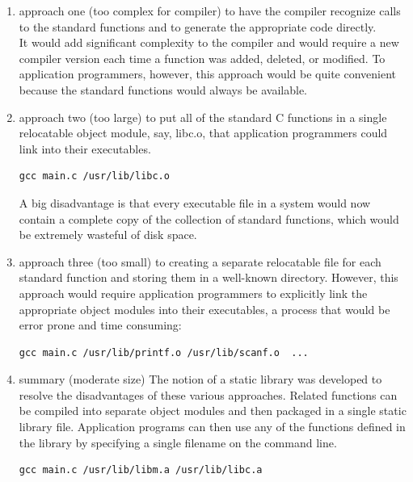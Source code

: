 \documentclass[11pt]{article}
\begin{document}
\begin{enumerate}
\item approach one (too complex for compiler)
\label{sec:org861f91d}
to have the compiler recognize calls to the standard functions and to generate the appropriate code directly.\\
It would add significant complexity to the compiler and would require a new compiler version each time a function was added, deleted, or modified. To application programmers, however, this approach would be quite convenient because the standard functions would always be available.\\

\item approach two (too large)
\label{sec:orgc216fb0}
to put all of the standard C functions in a single relocatable object module, say, libc.o, that application programmers could link into their executables.\\
\begin{verbatim}
gcc main.c /usr/lib/libc.o
\end{verbatim}
A big disadvantage is that every executable file in a system would now contain a complete copy of the collection of standard functions, which would be extremely wasteful of disk space.\\

\item approach three (too small)
\label{sec:org3bd6f1d}
to creating a separate relocatable file for each standard function and storing them in a well-known directory. However, this approach would require application programmers to explicitly link the appropriate object modules into their executables, a process that would be error prone and time consuming:\\
\begin{verbatim}
gcc main.c /usr/lib/printf.o /usr/lib/scanf.o  ...
\end{verbatim}


\item summary (moderate size)
\label{sec:org9545861}
The notion of a static library was developed to resolve the disadvantages of these various approaches. Related functions can be compiled into separate object modules and then packaged in a single static library file. Application programs can then use any of the functions defined in the library by specifying a single filename on the command line.\\
\begin{verbatim}
gcc main.c /usr/lib/libm.a /usr/lib/libc.a
\end{verbatim}


\end{enumerate}
\end{document}
